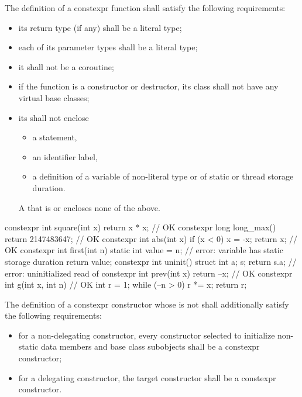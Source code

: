 \pnum
{}%
%
The definition of a constexpr function shall satisfy the following
requirements:
\begin{itemize}
\item
its return type (if any) shall be a literal type;

\item
each of its parameter types shall be a literal type;

\item
it shall not be a coroutine;

\item
if the function is a constructor or destructor,
its class shall not have any virtual base classes;

\item
its  shall not enclose
\begin{itemize}
\item a  statement,
\item an identifier label,
\item a definition of a variable
of non-literal type or
of static or thread storage duration.
\end{itemize}
\begin{note}
A  that is  or 
encloses none of the above.
\end{note}
\end{itemize}

\begin{example}
\begin{codeblock}
constexpr int square(int x)
  { return x * x; }             // OK
constexpr long long_max()
  { return 2147483647; }        // OK
constexpr int abs(int x) {
  if (x < 0)
    x = -x;
  return x;                     // OK
}
constexpr int first(int n) {
  static int value = n;         // error: variable has static storage duration
  return value;
}
constexpr int uninit() {
  struct { int a; } s;
  return s.a;                   // error: uninitialized read of 
}
constexpr int prev(int x)
  { return --x; }               // OK
constexpr int g(int x, int n) { // OK
  int r = 1;
  while (--n > 0) r *= x;
  return r;
}
\end{codeblock}
\end{example}

\pnum
{}%
The definition of a constexpr constructor
whose  is not 
shall additionally satisfy the following requirements:
\begin{itemize}

\item
for a non-delegating constructor, every constructor selected to initialize non-static
data members and base class subobjects shall be a constexpr constructor;

\item
for a delegating constructor, the target constructor shall be a constexpr
constructor.
\end{itemize}

